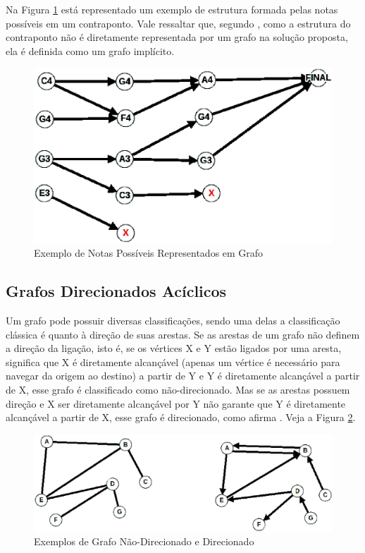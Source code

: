     Na Figura \ref{grafonotas} está representado um exemplo de estrutura formada pelas notas possíveis em um contraponto. Vale ressaltar que, segundo , como a estrutura do contraponto não é diretamente representada por um grafo na solução proposta, ela é definida como um grafo implícito.

    \begin{figure}[htb]
      \centering
      \includegraphics[scale=0.55]{figuras/grafonotas.eps}
      \caption{Exemplo de Notas Possíveis Representados em Grafo}
      \label{grafonotas}
    \end{figure}

    \subsection[Grafos Direcionados Acíclicos]{Grafos Direcionados Acíclicos}

      Um grafo pode possuir diversas classificações, sendo uma delas a classificação clássica é quanto à direção de suas arestas. Se as arestas de um grafo não definem a direção da ligação, isto é, se os vértices X e Y estão ligados por uma aresta, significa que X é diretamente alcançável (apenas um vértice é necessário para navegar da origem ao destino) a partir de Y e Y é diretamente alcançável a partir de X, esse grafo é classificado como não-direcionado. Mas se as arestas possuem direção e X ser diretamente alcançável por Y não garante que Y é diretamente alcançável a partir de X, esse grafo é direcionado, como afirma . Veja a Figura \ref{nodirxdir}.

      \begin{figure}[htb]
        \centering
        \includegraphics[scale=0.47]{figuras/nodirxdir.eps}
        \caption{Exemplos de Grafo Não-Direcionado e Direcionado}
        \label{nodirxdir}
      \end{figure}

